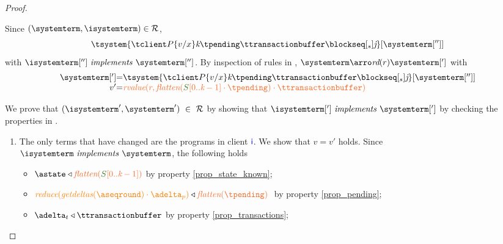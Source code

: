 \begin{proof}
\begin{itemize}
\begin{itemize}
				Since $(\systemterm,\isystemterm)\in \mathcal{R}$,
				\[ \tsystem{\tclienti{{\tprogram}\subst{x}{v}}{\tknown}{\tpending}{\ttransactionbuffer}{\tsent}{\treceivebuffer}}[{\systemterm['']}]\]
				with $\implements{\isystemterm['']}{\systemterm['']}$. By inspection of rules in \figref{}, 
				$\systemterm \arroi{\readtran{r}} \systemterm[']$ with
				\[\begin{array}{r@{=}l}
					\systemterm['] & \tsystem{\tclienti{{\tprogram}\subst{x}{v}}{\tknown}{\tpending}{\ttransactionbuffer}{\tsent}{\treceivebuffer}}[{\systemterm['']}]\\
					v' &  \rvalue{r}{\flatten {\queuemessage[0..\tknown-1] \cdot \tpending} \cdot \ttransactionbuffer}	
				  \end{array}		
				\]
				
				We  prove that $(\isystemterm',\systemterm') \ \in \ \mathcal{R}$ by showing that $\implements{\isystemterm[']}{\systemterm[']}$ 
				by checking the properties in .			
					\begin{enumerate}
						\item The only terms that have changed are the programs in client $\textcolor{blue}{{\sf i}}$.  We show that $v=v'$ holds. Since 
						$\implements{\isystemterm}{\systemterm}$, the following holds
						\begin{itemize}
							\item $\known \triangleleft \flatten {\queuemessage[0..\tknown-1]}$ by property \ref{prop_state_known};
							\item $\ireduce{\igetdeltas{\pending}\cdot{\pushbuffer}}\triangleleft \flatten{\tpending} \ $ by property \ref{prop_pending};
							\item $\transactionbuffer \triangleleft{\ttransactionbuffer}$ by property \ref{prop_transactions};
						\end{itemize}
						

\end{enumerate}
\end{itemize}
\end{itemize}
\end{proof}
